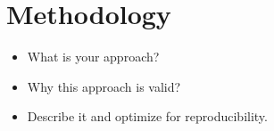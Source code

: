 \section{Methodology}

\begin{itemize}
    \item What is your approach?
    \item Why this approach is valid?
    \item Describe it and optimize for reproducibility.
\end{itemize}